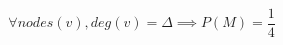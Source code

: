 \begin{equation}
\label{eqn:eqn-odds-all}
\forall nodes (v), deg(v) = \Delta \implies P(M) = \frac{1}{4}
\end{equation}
